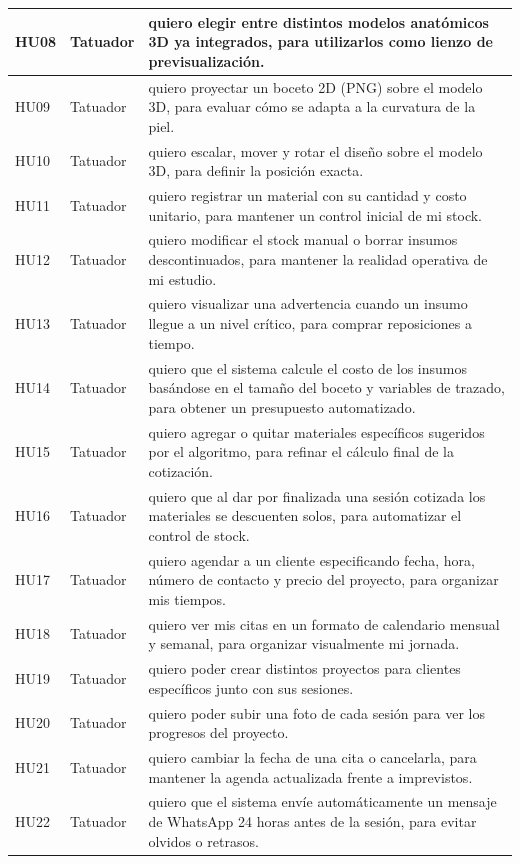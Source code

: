 \documentclass[12pt,letterpaper,oneside]{report}
\begin{document}
\begin{longtable}{|l|p{3.5cm}|p{9.5cm}|}
  HU08 & Tatuador & quiero elegir entre distintos modelos anatómicos 3D ya integrados, para utilizarlos como lienzo de previsualización. \\ \hline
  HU09 & Tatuador & quiero proyectar un boceto 2D (PNG) sobre el modelo 3D, para evaluar cómo se adapta a la curvatura de la piel. \\ \hline
  HU10 & Tatuador & quiero escalar, mover y rotar el diseño sobre el modelo 3D, para definir la posición exacta. \\ \hline
  HU11 & Tatuador & quiero registrar un material con su cantidad y costo unitario, para mantener un control inicial de mi stock. \\ \hline
  HU12 & Tatuador & quiero modificar el stock manual o borrar insumos descontinuados, para mantener la realidad operativa de mi estudio. \\ \hline
  HU13 & Tatuador & quiero visualizar una advertencia cuando un insumo llegue a un nivel crítico, para comprar reposiciones a tiempo. \\ \hline
  HU14 & Tatuador & quiero que el sistema calcule el costo de los insumos basándose en el tamaño del boceto y variables de trazado, para obtener un presupuesto automatizado. \\ \hline
  HU15 & Tatuador & quiero agregar o quitar materiales específicos sugeridos por el algoritmo, para refinar el cálculo final de la cotización. \\ \hline
  HU16 & Tatuador & quiero que al dar por finalizada una sesión cotizada los materiales se descuenten solos, para automatizar el control de stock. \\ \hline
  HU17 & Tatuador & quiero agendar a un cliente especificando fecha, hora, número de contacto y precio del proyecto, para organizar mis tiempos. \\ \hline
  HU18 & Tatuador & quiero ver mis citas en un formato de calendario mensual y semanal, para organizar visualmente mi jornada. \\ \hline
  HU19 & Tatuador & quiero poder crear distintos proyectos para clientes específicos junto con sus sesiones. \\ \hline
  HU20 & Tatuador & quiero poder subir una foto de cada sesión para ver los progresos del proyecto. \\ \hline
  HU21 & Tatuador & quiero cambiar la fecha de una cita o cancelarla, para mantener la agenda actualizada frente a imprevistos. \\ \hline
  HU22 & Tatuador & quiero que el sistema envíe automáticamente un mensaje de WhatsApp 24 horas antes de la sesión, para evitar olvidos o retrasos. \\ \hline

\end{longtable}
\end{document}
